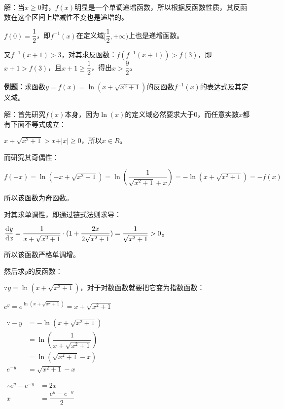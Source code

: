 \documentclass[UTF8, 12pt]{ctexart}
\begin{document}
        解：当$x\geqslant0$时，$f(x)$明显是一个单调递增函数，所以根据反函数性质，其反函数在这个区间上增减性不变也是递增的。

        $f(0)=\dfrac{1}{2}$，即$f^{-1}(x)$在定义域$[\dfrac{1}{2},+\infty)$上也是递增函数。

        又$f^{-1}(x+1)>3$，对其求反函数：$f(f^{-1}(x+1))>f(3)$，即$x+1>f(3)$，且$x+1\geqslant\dfrac{1}{2}$，得出$x>\dfrac{9}{2}$。

        \textbf{例题：}求函数$y=f(x)=\ln(x+\sqrt{x^2+1})$的反函数$f^{-1}(x)$的表达式及其定义域。

        解：首先研究$f(x)$本身，因为$\ln(x)$的定义域必然要求大于0，而任意实数$x$都有下面不等式成立：

        $x+\sqrt{x^2+1}>x+\vert x\vert \geqslant 0$，所以$x\in R$。

        而研究其奇偶性：

        $f(-x)=\ln(-x+\sqrt{x^2+1})=\ln(\dfrac{1}{\sqrt{x^2+1}+x})=-\ln(x+\sqrt{x^2+1})=-f(x)$

        所以该函数为奇函数。

        对其求单调性，即通过链式法则求导：

        $\dfrac{\rm{d}\textit{y}}{\rm{d}\textit{x}}=\dfrac{1}{x+\sqrt{x^2+1}}\cdot (1+\dfrac{2x}{2\sqrt{x^2+1}})=\dfrac{1}{\sqrt{x^2+1}}>0$。\medskip

        所以该函数严格单调增。

        然后求$y$的反函数：

        $\because y=\ln(x+\sqrt{x^2+1})$，对于对数函数就要把它变为指数函数：

        $e^y=e^{\ln(x+\sqrt{x^2+1})}=x+\sqrt{x^2+1}$

        $
        \begin{aligned}
            \because -y & =-\ln(x+\sqrt{x^2+1})          \\
            & =\ln(\dfrac{1}{x+\sqrt{x^2+1}}) \\
            & =\ln(\sqrt{x^2+1}-x)           \\
            e^{-y}      & =\sqrt{x^2+1}-x
        \end{aligned}
        $

        $
        \begin{aligned}
            \therefore e^y-e^{-y} & =2x                   \\
            x                     & =\dfrac{e^y-e^{-y}}{2}
        \end{aligned}
        $
\end{document}
